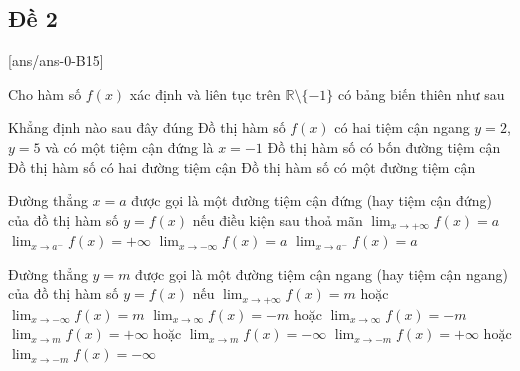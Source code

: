 \subsection{Đề 2}
[ans/ans-0-B15]
\caulc
\begin{ex}%
	Cho hàm số $f(x)$ xác định và liên tục trên $\mathbb{R}\setminus \{-1\}$ có bảng biến thiên như sau
	\begin{center}
	\end{center}
	Khẳng định nào sau đây đúng
	\choice
	{\True Đồ thị hàm số $f(x)$ có hai tiệm cận ngang $y=2$, $y=5$ và có một tiệm cận đứng là $x=-1$}
	{Đồ thị hàm số có bốn đường tiệm cận}
	{Đồ thị hàm số có hai đường tiệm cận}
	{Đồ thị hàm số có một đường tiệm cận}
\end{ex}	
\begin{ex}%
    Đường thẳng $x = a$ được gọi là một đường tiệm cận đứng (hay tiệm cận đứng) của
	đồ thị hàm số $ y = f (x)$ nếu điều kiện sau thoả mãn
	\choice
	{$\displaystyle\lim_{x\to +\infty }f(x)=a$}
	{\True $\displaystyle\lim_{x\to a^-}f(x)=+\infty $}
	{$\displaystyle\lim_{x\to -\infty }f(x)=a$}
	{$\displaystyle\lim_{x\to a^-}f(x)=a $}
\end{ex}
\begin{ex}%
Đường thẳng $ y = m $ được gọi là một đường tiệm cận ngang (hay tiệm cận ngang) của
đồ thị hàm số $ y = f (x) $ nếu
	\choice
	{\True $\displaystyle\lim_{x\to +\infty }f(x)=m $ hoặc $\displaystyle\lim_{x\to -\infty }f(x)=m $}
	{$\displaystyle\lim_{x\to \infty }f(x)=-m $ hoặc $\displaystyle\lim_{x\to \infty }f(x)=-m $}
	{$\displaystyle\lim_{x\to m }f(x)=+\infty$ hoặc $\displaystyle\lim_{x\to m }f(x)=-\infty $}
	{$\displaystyle\lim_{x\to -m }f(x)=+\infty$ hoặc $\displaystyle\lim_{x\to -m }f(x)=-\infty $}
\end{ex}
